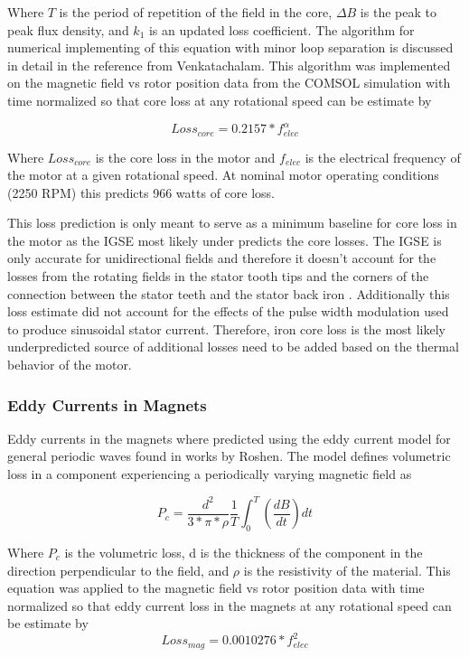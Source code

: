 \documentclass[]{aiaa-tc}%
\begin{document}
Where $T$ is the period of repetition of the field in the core, $\Delta B$ is the peak to peak flux density, and $k_{1}$ is an updated loss coefficient. The algorithm for numerical implementing of this equation with minor loop separation is discussed in detail in the reference from Venkatachalam.\cite{CoreLoss} This algorithm was implemented on the magnetic field vs rotor position data from the COMSOL simulation with time normalized so that core loss at any rotational speed can be estimate by

\begin{equation}
Loss_{core} = 0.2157*f_{elec}^{\alpha}
\label{eq:CoreLoss3}
\end{equation}

Where $Loss_{core}$ is the core loss in the motor and $f_{elec}$ is the electrical frequency of the motor at a given rotational speed. At nominal motor operating conditions (2250 RPM) this predicts 966 watts of core loss. 

This loss prediction is only meant to serve as a minimum baseline for core loss in the motor as the IGSE most likely under predicts the core losses. The IGSE is only accurate for unidirectional fields and therefore it doesn't account for the losses from the rotating fields in the stator tooth tips and the corners of the connection between the stator teeth and the stator back iron \cite{Krings}. Additionally this loss estimate did not account for the effects of the pulse width modulation used to produce sinusoidal stator current. Therefore, iron core loss is the most likely underpredicted source of additional losses need to be added based on the thermal behavior of the motor. 
\subsubsection{Eddy Currents in Magnets}
Eddy currents in the magnets where predicted using the eddy current model for general periodic waves found in works by Roshen\cite{Roshen}. The model defines volumetric loss in a component experiencing a periodically varying magnetic field as 

\begin{equation}
P_{c} = \frac{d^2}{3*\pi*\rho}\frac{1}{T}\int_{0}^{T}(\frac{dB}{dt})dt
\label{eq:EddyLoss}
\end{equation}

Where $P_{c}$ is the volumetric loss, d is the thickness of the component in the direction perpendicular to the field, and $\rho$ is the resistivity of the material. This equation was applied to the magnetic field vs rotor position data with time normalized so that eddy current loss in the magnets at any rotational speed can be estimate by 
\begin{equation}
Loss_{mag} = 0.0010276*f_{elec}^{2}
\label{eq:EddyLoss2}
\end{equation}
\end{document}
